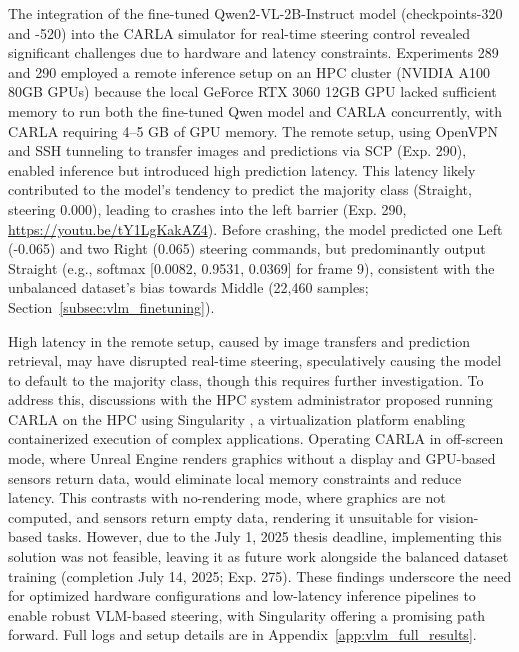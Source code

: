 The integration of the fine-tuned Qwen2-VL-2B-Instruct model (checkpoints-320 and -520) into the CARLA simulator \cite{Dosovitskiy2017} for real-time steering control revealed significant challenges due to hardware and latency constraints. Experiments 289 and 290 employed a remote inference setup on an HPC cluster (NVIDIA A100 80GB GPUs) because the local GeForce RTX 3060 12GB GPU lacked sufficient memory to run both the fine-tuned Qwen model and CARLA concurrently, with CARLA requiring 4--5 GB of GPU memory. The remote setup, using OpenVPN and SSH tunneling to transfer images and predictions via SCP (Exp. 290), enabled inference but introduced high prediction latency. This latency likely contributed to the model’s tendency to predict the majority class (Straight, steering 0.000), leading to crashes into the left barrier (Exp. 290, \url{https://youtu.be/tY1LgKakAZ4}). Before crashing, the model predicted one Left (-0.065) and two Right (0.065) steering commands, but predominantly output Straight (e.g., softmax [0.0082, 0.9531, 0.0369] for frame 9), consistent with the unbalanced dataset’s bias towards Middle (22,460 samples; Section~\ref{subsec:vlm_finetuning}).

High latency in the remote setup, caused by image transfers and prediction retrieval, may have disrupted real-time steering, speculatively causing the model to default to the majority class, though this requires further investigation. To address this, discussions with the HPC system administrator proposed running CARLA on the HPC using Singularity \cite{kurtzer2017singularity}, a virtualization platform enabling containerized execution of complex applications. Operating CARLA in off-screen mode, where Unreal Engine renders graphics without a display and GPU-based sensors return data, would eliminate local memory constraints and reduce latency. This contrasts with no-rendering mode, where graphics are not computed, and sensors return empty data, rendering it unsuitable for vision-based tasks. However, due to the July 1, 2025 thesis deadline, implementing this solution was not feasible, leaving it as future work alongside the balanced dataset training (completion July 14, 2025; Exp. 275). These findings underscore the need for optimized hardware configurations and low-latency inference pipelines to enable robust VLM-based steering, with Singularity offering a promising path forward. Full logs and setup details are in Appendix~\ref{app:vlm_full_results}.


